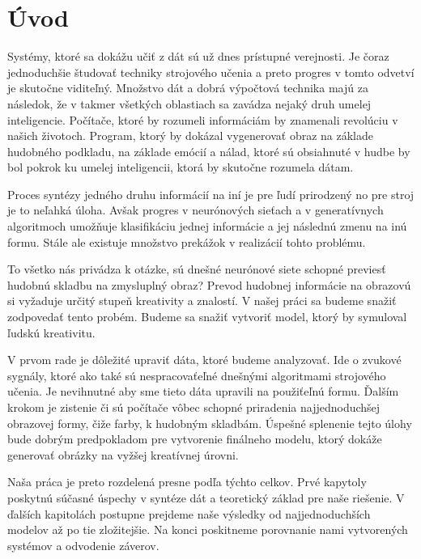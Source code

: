 

\chapter*{Úvod}

Systémy, ktoré sa dokážu učiť z dát sú už dnes prístupné verejnosti. Je čoraz jednoduchšie študovať techniky strojového učenia a preto progres v tomto odvetví je skutočne viditeľný. Množstvo dát a dobrá výpočtová technika majú za následok, že v takmer všetkých oblastiach sa zavádza nejaký druh umelej inteligencie. Počítače, ktoré by rozumeli informáciám by znamenali revolúciu v našich životoch. Program, ktorý by dokázal vygenerovať obraz na základe hudobného podkladu, na základe emócií a nálad, ktoré sú obsiahnuté v hudbe by bol pokrok ku umelej inteligencii, ktorá by skutočne rozumela dátam.

Proces syntézy jedného druhu informácií na iní je pre ľudí prirodzený no pre stroj je to neľahká úloha. Avšak progres v neurónových sieťach a v generatívnych algoritmoch umožňuje klasifikáciu jednej informácie a jej následnú zmenu na inú formu. Stále ale existuje množstvo prekážok v realizácií tohto problému.

To všetko nás privádza k otázke, sú dnešné neurónové siete schopné previesť hudobnú skladbu na zmysluplný obraz?
Prevod hudobnej informácie na obrazovú si vyžaduje určitý stupeň kreativity a znalostí. 
V našej práci sa budeme snažiť zodpovedať tento probém.
Budeme sa snažiť vytvoriť model, ktorý by symuloval ľudskú kreativitu.

V prvom rade je dôležité upraviť dáta, ktoré budeme analyzovať. Ide o zvukové sygnály, ktoré ako také sú nespracovaťeľné dnešnými algoritmami strojového učenia.
Je nevihnutné aby sme tieto dáta upravili na použiťeľnú formu.
Ďalším krokom je zistenie či sú počítače vôbec schopné priradenia najjednoduchšej obrazovej formy, čiže farby, k hudobným skladbám.
Úspešné splenenie tejto úlohy bude dobrým predpokladom pre vytvorenie finálneho modelu, ktorý dokáže generovať obrázky na vyžšej kreatívnej úrovni.

Naša práca je preto rozdelená presne podľa týchto celkov.
Prvé kapytoly poskytnú súčasné úspechy v syntéze dát a teoretický základ pre naše riešenie.
V ďalších kapitolách postupne prejdeme naše výsledky od najjednoduchších modelov až po tie zložitejšie.
Na konci poskitneme porovnanie nami vytvorených systémov a odvodenie záverov.  

